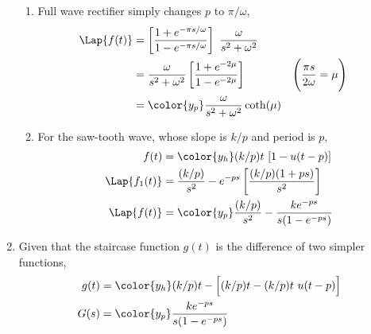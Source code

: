 \begin{enumerate}
\begin{enumerate}
              \item Full wave rectifier simply changes $ p $ to $ \pi/\omega $,
                    \begin{align}
                        \Lap\{f(t)\}                & = \left[ \frac{1
                                + e^{-\pi s / \omega}}
                            {1 - e^{- \pi s / \omega}} \right]\
                        \frac{\omega}{s^2 + \omega^2}                             \\
                                                    & = \frac{\omega}
                        {s^2 + \omega^2}
                        \left[ \frac{1 + e^{-2\mu}}
                        {1 - e^{-2\mu}} \right]     &
                        \Bigg(\frac{\pi s}{2\omega} & = \mu\Bigg)                 \\
                                                    & = \color{y_p} \frac{\omega}
                        {s^2 + \omega^2} \coth(\mu)
                    \end{align}

              \item For the saw-tooth wave, whose slope is $ k/p $ and period is $ p $,
                    \begin{align}
                        f(t)           & = \color{y_h} (k/p)t\ [1 - u(t - p)] \\
                        \Lap\{f_1(t)\} & = \frac{(k/p)}{s^2} - e^{-ps}
                        \left[ \frac{(k/p)(1 + ps)}{s^2} \right]              \\
                        \Lap\{f(t)\}   & = \color{y_p}  \frac{(k/p)}{s^2}
                        - \frac{k e^{-ps}}{s(1 - e^{-ps})}
                    \end{align}
          \end{enumerate}

    \item Given that the staircase function $ g(t) $ is the difference of two
          simpler functions,
          \begin{align}
              g(t) & =\color{y_h} (k/p)t - \Big[(k/p)t - (k/p)t\ u(t-p)\Big] \\
              G(s) & = \color{y_p} \frac{ke^{-ps}}{s(1 - e^{-ps})}
          \end{align}
\end{enumerate}